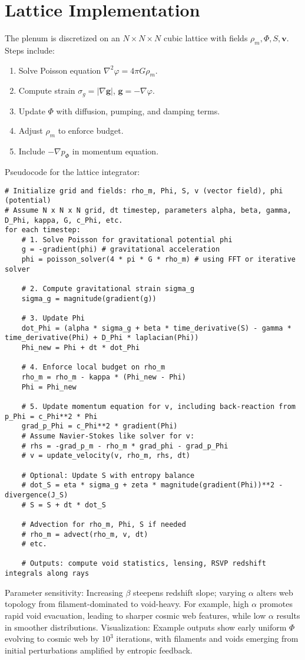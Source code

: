 \documentclass[11pt]{article}
\theoremstyle{plain}
\theoremstyle{definition}
\begin{document}
\section{Lattice Implementation}
The plenum is discretized on an $N \times N \times N$ cubic lattice with fields $\rho_m, \Phi, S, \bm{v}$. Steps include:
\begin{enumerate}
    \item Solve Poisson equation $\nabla^2 \varphi = 4\pi G \rho_m$.
    \item Compute strain $\sigma_g = |\nabla \bm{g}|$, $\bm{g} = -\nabla \varphi$.
    \item Update $\Phi$ with diffusion, pumping, and damping terms.
    \item Adjust $\rho_m$ to enforce budget.
    \item Include $-\nabla p_\Phi$ in momentum equation.
\end{enumerate}
Pseudocode for the lattice integrator:
\begin{verbatim}
# Initialize grid and fields: rho_m, Phi, S, v (vector field), phi (potential)
# Assume N x N x N grid, dt timestep, parameters alpha, beta, gamma, D_Phi, kappa, G, c_Phi, etc.
for each timestep:
    # 1. Solve Poisson for gravitational potential phi
    g = -gradient(phi) # gravitational acceleration
    phi = poisson_solver(4 * pi * G * rho_m) # using FFT or iterative solver
   
    # 2. Compute gravitational strain sigma_g
    sigma_g = magnitude(gradient(g))
   
    # 3. Update Phi
    dot_Phi = (alpha * sigma_g + beta * time_derivative(S) - gamma * time_derivative(Phi) + D_Phi * laplacian(Phi))
    Phi_new = Phi + dt * dot_Phi
   
    # 4. Enforce local budget on rho_m
    rho_m = rho_m - kappa * (Phi_new - Phi)
    Phi = Phi_new
   
    # 5. Update momentum equation for v, including back-reaction from p_Phi = c_Phi**2 * Phi
    grad_p_Phi = c_Phi**2 * gradient(Phi)
    # Assume Navier-Stokes like solver for v:
    # rhs = -grad_p_m - rho_m * grad_phi - grad_p_Phi
    # v = update_velocity(v, rho_m, rhs, dt)
   
    # Optional: Update S with entropy balance
    # dot_S = eta * sigma_g + zeta * magnitude(gradient(Phi))**2 - divergence(J_S)
    # S = S + dt * dot_S
   
    # Advection for rho_m, Phi, S if needed
    # rho_m = advect(rho_m, v, dt)
    # etc.
   
    # Outputs: compute void statistics, lensing, RSVP redshift integrals along rays
\end{verbatim}
Parameter sensitivity: Increasing $\beta$ steepens redshift slope; varying $\alpha$ alters web topology from filament-dominated to void-heavy. For example, high $\alpha$ promotes rapid void evacuation, leading to sharper cosmic web features, while low $\alpha$ results in smoother distributions.
Visualization: Example outputs show early uniform $\Phi$ evolving to cosmic web by $10^3$ iterations, with filaments and voids emerging from initial perturbations amplified by entropic feedback.
\end{document}
